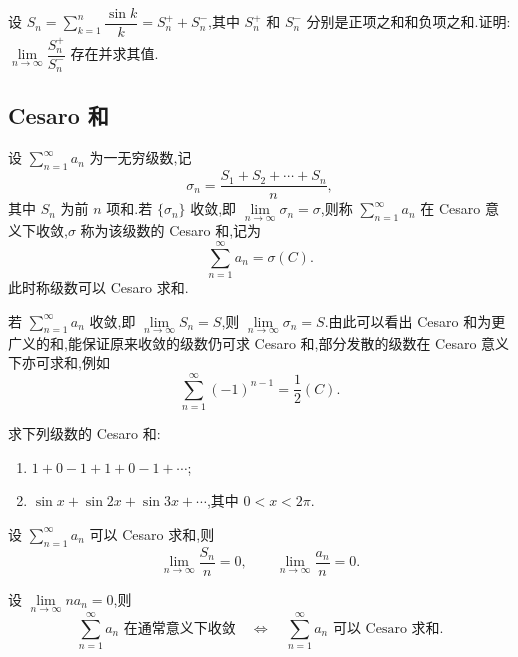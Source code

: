 \documentclass[../../数学分析培优讲义.tex]{subfiles}
\begin{document}
\begin{example}
设 $\displaystyle S_n=\sum\limits_{k=1}^n\dfrac{\sin k}{k}=S_n^++S_n^-$,其中 $S_n^+$ 和 $S_n^-$ 分别是正项之和和负项之和.证明:$\displaystyle\lim\limits_{n\to\infty}\dfrac{S_n^+}{S_n^-}$ 存在并求其值.
\end{example}
\exampleblank



\subsection{Cesaro 和}

\begin{definition}
设 $\displaystyle\sum\limits_{n=1}^{\infty}a_n$ 为一无穷级数,记
\[
    \sigma_n=\dfrac{S_1+S_2+\cdots+S_n}{n},
\]
其中 $S_n$ 为前 $n$ 项和.若 $\{\sigma_n\}$ 收敛,即 $\displaystyle\lim\limits_{n\to\infty}\sigma_n=\sigma$,则称 $\displaystyle\sum\limits_{n=1}^{\infty}a_n$ 在 Cesaro 意义下收敛,$\sigma$ 称为该级数的 Cesaro 和,记为
\[
    \sum\limits_{n=1}^{\infty}a_n=\sigma(C).
\]
此时称级数可以 Cesaro 求和.
\end{definition}

\begin{remark}
若 $\displaystyle\sum\limits_{n=1}^{\infty}a_n$ 收敛,即 $\displaystyle\lim\limits_{n\to\infty}S_n=S$,则 $\displaystyle\lim\limits_{n\to\infty}\sigma_n=S$.由此可以看出 Cesaro 和为更广义的和,能保证原来收敛的级数仍可求 Cesaro 和,部分发散的级数在 Cesaro 意义下亦可求和,例如
\[
    \sum\limits_{n=1}^{\infty}(-1)^{n-1}=\dfrac{1}{2}(C).
\]
\end{remark}

\begin{example}
求下列级数的 Cesaro 和:
\begin{enumerate}[label=(\arabic*)]
    \item $1+0-1+1+0-1+\cdots$;
    \item $\sin x+\sin2x+\sin3x+\cdots$,其中 $0<x<2\pi$.
\end{enumerate}
\end{example}
\exampleblank

\begin{example}
设 $\displaystyle\sum\limits_{n=1}^{\infty}a_n$ 可以 Cesaro 求和,则
\[
    \lim\limits_{n\to\infty}\dfrac{S_n}{n}=0,
    \qquad
    \lim\limits_{n\to\infty}\dfrac{a_n}{n}=0.
\]
\end{example}
\exampleblank

\begin{example}[\markstar]
设 $\displaystyle\lim\limits_{n\to\infty}na_n=0$,则
\[
    \sum\limits_{n=1}^{\infty}a_n\text{ 在通常意义下收敛}
    \quad\Longleftrightarrow\quad
    \sum\limits_{n=1}^{\infty}a_n\text{ 可以 Cesaro 求和}.
\]
\end{example}
\exampleblank
\end{document}
